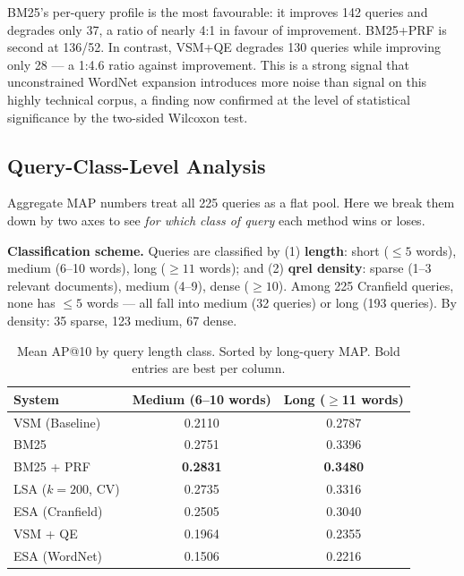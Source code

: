 \documentclass{article}
\begin{document}
BM25's per-query profile is the most favourable: it improves 142 queries and degrades only 37, a ratio of nearly 4:1 in favour of improvement. BM25+PRF is second at 136/52. In contrast, VSM+QE degrades 130 queries while improving only 28 --- a 1:4.6 ratio against improvement. This is a strong signal that unconstrained WordNet expansion introduces more noise than signal on this highly technical corpus, a finding now confirmed at the level of statistical significance by the two-sided Wilcoxon test.

\subsection{Query-Class-Level Analysis}

Aggregate MAP numbers treat all 225 queries as a flat pool. Here we break them down by two axes to see \emph{for which class of query} each method wins or loses.

\textbf{Classification scheme.} Queries are classified by (1) \textbf{length}: short ($\le 5$ words), medium (6--10 words), long ($\ge 11$ words); and (2) \textbf{qrel density}: sparse (1--3 relevant documents), medium (4--9), dense ($\ge 10$). Among 225 Cranfield queries, none has $\le 5$ words --- all fall into medium (32 queries) or long (193 queries). By density: 35 sparse, 123 medium, 67 dense.

\begin{table}[H]
\centering
\renewcommand{\arraystretch}{1.2}
\begin{tabular}{lcc}
\toprule
\textbf{System} & \textbf{Medium (6--10 words)} & \textbf{Long ($\ge$11 words)} \\
\midrule
VSM (Baseline)      & 0.2110 & 0.2787 \\
BM25                & 0.2751 & 0.3396 \\
BM25 + PRF          & \textbf{0.2831} & \textbf{0.3480} \\
LSA ($k{=}200$, CV) & 0.2735 & 0.3316 \\
ESA (Cranfield)     & 0.2505 & 0.3040 \\
VSM + QE            & 0.1964 & 0.2355 \\
ESA (WordNet)       & 0.1506 & 0.2216 \\
\bottomrule
\end{tabular}
\caption{Mean AP@10 by query length class. Sorted by long-query MAP. Bold entries are best per column.}
\label{tab:lengthclass}
\end{table}
\end{document}
